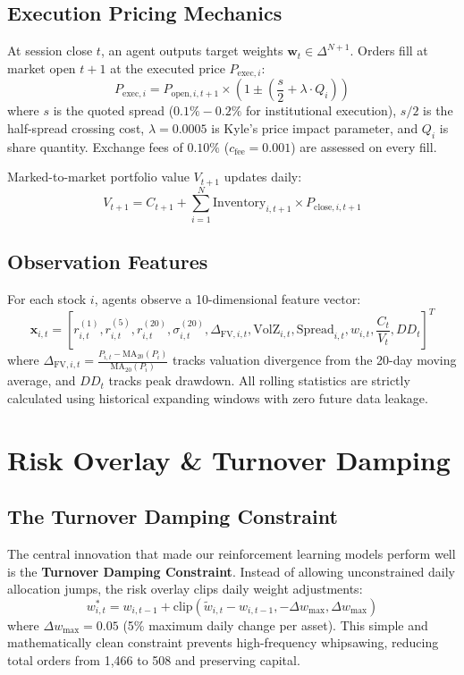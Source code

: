 \documentclass[10pt,journal,compsoc]{IEEEtran}
\begin{document}
\subsection{Execution Pricing Mechanics}
At session close $t$, an agent outputs target weights $\mathbf{w}_t \in \Delta^{N+1}$. Orders fill at market open $t+1$ at the executed price $P_{\text{exec}, i}$:
\begin{equation}
P_{\text{exec}, i} = P_{\text{open}, i, t+1} \times \left(1 \pm \left(\frac{s}{2} + \lambda \cdot Q_i\right)\right)
\end{equation}
where $s$ is the quoted spread ($0.1\% - 0.2\%$ for institutional execution), $s/2$ is the half-spread crossing cost, $\lambda = 0.0005$ is Kyle's price impact parameter, and $Q_i$ is share quantity. Exchange fees of $0.10\%$ ($c_{\text{fee}} = 0.001$) are assessed on every fill.

Marked-to-market portfolio value $V_{t+1}$ updates daily:
\begin{equation}
V_{t+1} = C_{t+1} + \sum_{i=1}^N \text{Inventory}_{i, t+1} \times P_{\text{close}, i, t+1}
\end{equation}

\subsection{Observation Features}
For each stock $i$, agents observe a 10-dimensional feature vector:
\begin{equation}
\mathbf{x}_{i, t} = \left[ r_{i, t}^{(1)}, r_{i, t}^{(5)}, r_{i, t}^{(20)}, \sigma_{i, t}^{(20)}, \Delta_{\text{FV}, i, t}, \text{VolZ}_{i, t}, \text{Spread}_{i, t}, w_{i, t}, \frac{C_t}{V_t}, DD_t \right]^T
\end{equation}
where $\Delta_{\text{FV}, i, t} = \frac{P_{i, t} - \text{MA}_{20}(P_i)}{\text{MA}_{20}(P_i)}$ tracks valuation divergence from the 20-day moving average, and $DD_t$ tracks peak drawdown. All rolling statistics are strictly calculated using historical expanding windows with zero future data leakage.

\section{Risk Overlay \& Turnover Damping}

\subsection{The Turnover Damping Constraint}
The central innovation that made our reinforcement learning models perform well is the \textbf{Turnover Damping Constraint}. Instead of allowing unconstrained daily allocation jumps, the risk overlay clips daily weight adjustments:
\begin{equation}
w_{i, t}^* = w_{i, t-1} + \text{clip}\left(\tilde{w}_{i, t} - w_{i, t-1}, -\Delta w_{\max}, \Delta w_{\max}\right)
\end{equation}
where $\Delta w_{\max} = 0.05$ (5\% maximum daily change per asset). This simple and mathematically clean constraint prevents high-frequency whipsawing, reducing total orders from 1,466 to 508 and preserving capital.
\end{document}
